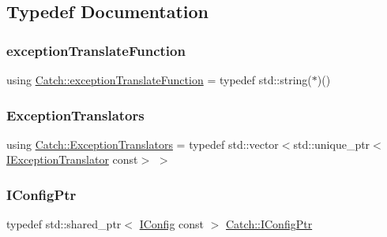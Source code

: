 \subsection{Typedef Documentation}
\mbox{\label{namespace_catch_ae8d8673884dc36b98875106322a2a37b}} 
\subsubsection{\texorpdfstring{exceptionTranslateFunction}{exceptionTranslateFunction}}
{\footnotesize\ttfamily using \mbox{\hyperlink{namespace_catch_ae8d8673884dc36b98875106322a2a37b}{Catch\+::exception\+Translate\+Function}} = typedef std\+::string($\ast$)()}

\mbox{\label{namespace_catch_a7ad07967e688fdc03cf784f58be4b741}} 
\subsubsection{\texorpdfstring{ExceptionTranslators}{ExceptionTranslators}}
{\footnotesize\ttfamily using \mbox{\hyperlink{namespace_catch_a7ad07967e688fdc03cf784f58be4b741}{Catch\+::\+Exception\+Translators}} = typedef std\+::vector$<$std\+::unique\+\_\+ptr$<$\mbox{\hyperlink{struct_catch_1_1_i_exception_translator}{I\+Exception\+Translator}} const$>$ $>$}

\mbox{\label{namespace_catch_afd20a5d4f9d2f4d525db81a7765367b0}} 
\subsubsection{\texorpdfstring{IConfigPtr}{IConfigPtr}}
{\footnotesize\ttfamily typedef std\+::shared\+\_\+ptr$<$ \mbox{\hyperlink{struct_catch_1_1_i_config}{I\+Config}} const  $>$ \mbox{\hyperlink{namespace_catch_afd20a5d4f9d2f4d525db81a7765367b0}{Catch\+::\+I\+Config\+Ptr}}}

\mbox{\label{namespace_catch_ad1b36ac40c2739e52fd453dcdddf0d09}} 
